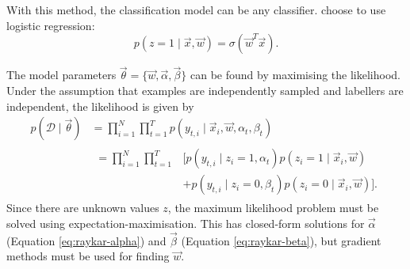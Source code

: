             With this method, the classification model can be any classifier. \citeauthor{raykar10} choose to use logistic regression:
            \begin{equation}
                \label{eq:raykar-logreg}
                p(z = 1 \mid \vec x, \vec w) = \sigma(\vec w^T \vec x).
            \end{equation}

            The model parameters $\vec \theta = \{\vec w, \vec \alpha, \vec \beta\}$ can be found by maximising the likelihood. Under the assumption that examples are independently sampled and labellers are independent, the likelihood is given by
            \begin{align*}
                p(\mathcal D \mid \vec \theta) &= \prod_{i = 1}^N \prod_{t = 1}^T p(y_{t, i} \mid \vec x_i, \vec w, \alpha_t, \beta_t)\\
                &\begin{aligned}= \prod_{i = 1}^N \prod_{t = 1}^T &\bigg[p(y_{t, i} \mid z_i = 1, \alpha_t) p(z_i = 1 \mid \vec x_i, \vec w)\\
                                                                  &+ p(y_{t, i} \mid z_i = 0, \beta_t) p(z_i = 0 \mid \vec x_i, \vec w)\bigg].\end{aligned}
            \end{align*}
            Since there are unknown values $z$, the maximum likelihood problem must be solved using expectation-maximisation. This has closed-form solutions for $\vec \alpha$ (Equation \ref{eq:raykar-alpha}) and $\vec \beta$ (Equation \ref{eq:raykar-beta}), but gradient methods must be used for finding $\vec w$.

